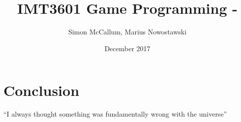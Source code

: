 \documentclass{article}
\title{IMT3601 Game Programming - \\ \todo{Your title here}}
\author{Simon McCallum, Marius Nowostawski}
\date{December 2017}
\begin{document}
\maketitle




\section{Conclusion}
``I always thought something was fundamentally wrong with the universe'' \citep{adams1995hitchhiker}



\end{document}
